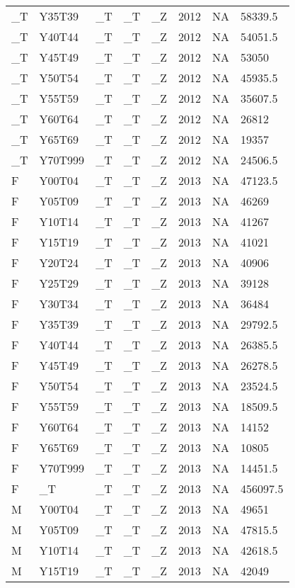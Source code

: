 \begin{longtable}[t]{llllllll}
\_T & Y35T39 & \_T & \_T & \_Z & 2012 & NA & 58339.5\\
\_T & Y40T44 & \_T & \_T & \_Z & 2012 & NA & 54051.5\\
\addlinespace
\_T & Y45T49 & \_T & \_T & \_Z & 2012 & NA & 53050\\
\_T & Y50T54 & \_T & \_T & \_Z & 2012 & NA & 45935.5\\
\_T & Y55T59 & \_T & \_T & \_Z & 2012 & NA & 35607.5\\
\_T & Y60T64 & \_T & \_T & \_Z & 2012 & NA & 26812\\
\_T & Y65T69 & \_T & \_T & \_Z & 2012 & NA & 19357\\
\addlinespace
\_T & Y70T999 & \_T & \_T & \_Z & 2012 & NA & 24506.5\\
F & Y00T04 & \_T & \_T & \_Z & 2013 & NA & 47123.5\\
F & Y05T09 & \_T & \_T & \_Z & 2013 & NA & 46269\\
F & Y10T14 & \_T & \_T & \_Z & 2013 & NA & 41267\\
F & Y15T19 & \_T & \_T & \_Z & 2013 & NA & 41021\\
\addlinespace
F & Y20T24 & \_T & \_T & \_Z & 2013 & NA & 40906\\
F & Y25T29 & \_T & \_T & \_Z & 2013 & NA & 39128\\
F & Y30T34 & \_T & \_T & \_Z & 2013 & NA & 36484\\
F & Y35T39 & \_T & \_T & \_Z & 2013 & NA & 29792.5\\
F & Y40T44 & \_T & \_T & \_Z & 2013 & NA & 26385.5\\
\addlinespace
F & Y45T49 & \_T & \_T & \_Z & 2013 & NA & 26278.5\\
F & Y50T54 & \_T & \_T & \_Z & 2013 & NA & 23524.5\\
F & Y55T59 & \_T & \_T & \_Z & 2013 & NA & 18509.5\\
F & Y60T64 & \_T & \_T & \_Z & 2013 & NA & 14152\\
F & Y65T69 & \_T & \_T & \_Z & 2013 & NA & 10805\\
\addlinespace
F & Y70T999 & \_T & \_T & \_Z & 2013 & NA & 14451.5\\
F & \_T & \_T & \_T & \_Z & 2013 & NA & 456097.5\\
M & Y00T04 & \_T & \_T & \_Z & 2013 & NA & 49651\\
M & Y05T09 & \_T & \_T & \_Z & 2013 & NA & 47815.5\\
M & Y10T14 & \_T & \_T & \_Z & 2013 & NA & 42618.5\\
\addlinespace
M & Y15T19 & \_T & \_T & \_Z & 2013 & NA & 42049\\

\end{longtable}
